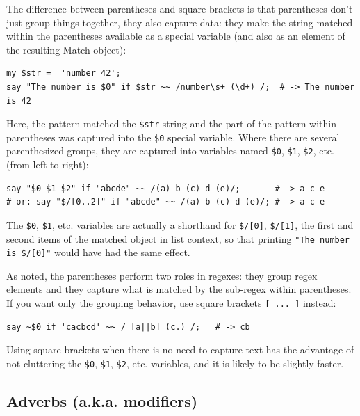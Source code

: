 The difference between parentheses and square brackets is 
that parentheses don't just group things together, 
they also capture data: they make the string matched within 
the parentheses available as a special variable (and also 
as an element of the resulting Match object):

\begin{verbatim}
my $str =  'number 42';
say "The number is $0" if $str ~~ /number\s+ (\d+) /;  # -> The number is 42
\end{verbatim}
%

Here, the pattern matched the \verb'$str' string and the 
part of the pattern within parentheses was captured into 
the \verb'$0' special variable. Where there are several 
parenthesized groups, they are captured into variables 
named \verb'$0', \verb'$1',  \verb'$2', etc. (from 
left to right):

\begin{verbatim}
say "$0 $1 $2" if "abcde" ~~ /(a) b (c) d (e)/;       # -> a c e
# or: say "$/[0..2]" if "abcde" ~~ /(a) b (c) d (e)/; # -> a c e
\end{verbatim}
%

The \verb'$0', \verb'$1', etc. variables are actually a 
shorthand for \verb'$/[0]', \verb'$/[1]', the first and 
second items of the matched 
object in list context, so that printing  
\verb'"The number is $/[0]"' would have had the same 
effect. 

As noted, the parentheses perform two roles in regexes: 
they group regex elements and they capture what is matched 
by the sub-regex within parentheses. If you want only the 
grouping behavior, use square brackets
\verb'[ ... ]' instead:

\begin{verbatim}
say ~$0 if 'cacbcd' ~~ / [a||b] (c.) /;   # -> cb
\end{verbatim}
%

Using square brackets when there is no need to capture 
text has the advantage of not cluttering the \verb'$0', 
\verb'$1', \verb'$2', etc. variables, and it is likely 
to be slightly faster.

\subsection{Adverbs (a.k.a. modifiers)}
\label{adverb}

